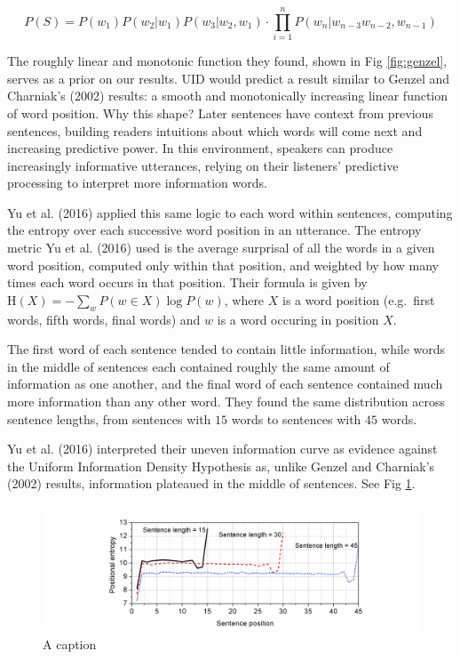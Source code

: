 \documentclass[
  english,
  man,floatsintext]{apa6}
\begin{document}
\[P(S) = P(w_1) P(w_2 | w_1) P(w_3 | w_2, w_1) \cdot \prod\limits_{i=1}^n P(w_n | w_{n-3} w_{n-2}, w_{n-1})\]

The roughly linear and monotonic function they found, shown in Fig \ref{fig:genzel}, serves as a prior on our results. UID would predict a result similar to Genzel and Charniak's (2002) results: a smooth and monotonically increasing linear function of word position. Why this shape? Later sentences have context from previous sentences, building readers intuitions about which words will come next and increasing predictive power. In this environment, speakers can produce increasingly informative utterances, relying on their listeners' predictive processing to interpret more information words.

Yu et al. (2016) applied this same logic to each word within sentences, computing the entropy over each successive word position in an utterance. The entropy metric Yu et al. (2016) used is the average surprisal of all the words in a given word position, computed only within that position, and weighted by how many times each word occurs in that position. Their formula is given by \(\text{H}(X) = -\sum_{w}P(w \in X) \log P(w)\), where \(X\) is a word position (e.g.~first words, fifth words, final words) and \(w\) is a word occuring in position \(X\).

The first word of each sentence tended to contain little information, while words in the middle of sentences each contained roughly the same amount of information as one another, and the final word of each sentence contained much more information than any other word. They found the same distribution across sentence lengths, from sentences with \(15\) words to sentences with \(45\) words.

Yu et al. (2016) interpreted their uneven information curve as evidence against the Uniform Information Density Hypothesis as, unlike Genzel and Charniak's (2002) results, information plateaued in the middle of sentences. See Fig \ref{fig:bnc-yu}.

\begin{figure}[tb]
\includegraphics[width=1\linewidth]{figs/bnc-yu} \caption{A caption}\label{fig:bnc-yu}
\end{figure}
\end{document}
